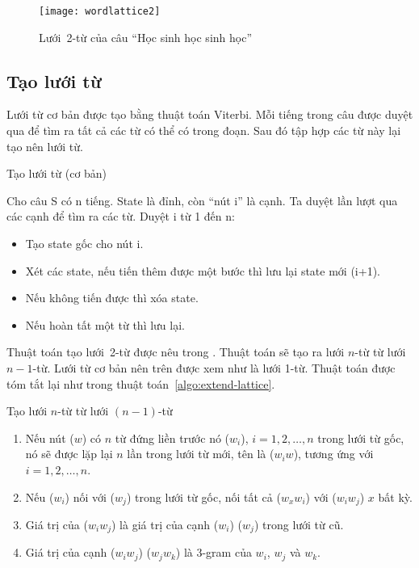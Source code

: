 \documentclass[a4paper,oneside,14pt]{extbook} %
\begin{document}
\begin{figure}[htbp]
  \centering
  \texttt{[image: wordlattice2]}
  \caption{Lưới~2-từ của câu ``Học sinh học sinh học''}
  \label{fig:wordlattice2}
\end{figure}

\subsection{Tạo lưới từ}
\label{sub:lattice:creation}

Lưới từ cơ bản được tạo bằng thuật toán Viterbi. Mỗi tiếng trong câu
được duyệt qua để tìm ra tất cả các từ có thể có trong đoạn. Sau đó
tập hợp các từ này lại tạo nên lưới từ.

\begin{algo}\caption{Tạo lưới từ (cơ bản)}
Cho câu S có n tiếng. State là đỉnh, còn ``nút i'' là cạnh. Ta duyệt
lần lượt qua các cạnh để tìm  ra các từ. Duyệt i từ 1 đến n:
\begin{itemize}
\item Tạo state gốc cho nút i.
\item Xét các state, nếu tiến thêm được một bước thì lưu lại state mới (i+1).
\item Nếu không tiến được thì xóa state.
\item Nếu hoàn tất một từ thì lưu lại.
\end{itemize}
\end{algo}

Thuật toán tạo lưới~2-từ được nêu trong \cite{Ravishankar}. Thuật toán
sẽ tạo ra lưới $n$-từ từ lưới $n-1$-từ. Lưới từ cơ bản nên trên được
xem như là lưới 1-từ. Thuật toán được tóm tắt lại như trong thuật
toán~\ref{algo:extend-lattice}.

\begin{algo}
\caption{Tạo lưới $n$-từ từ lưới $(n-1)$-từ}
\label{algo:extend-lattice}
\begin{enumerate}
\item Nếu nút ($w$) có $n$ từ đứng liền trước nó ($w_i$),
  $i=1,2,\ldots{},n$ trong lưới từ gốc, nó sẽ được lặp lại $n$ lần trong
  lưới từ mới, tên là ($w_{i}w$), tương ứng với $i=1,2,\ldots{},n$.
\item Nếu ($w_i$) nối với ($w_j$) trong lưới từ gốc, nối tất cả
  ($w_xw_i$) với ($w_iw_j$) $x$ bất kỳ.
\item Giá trị của ($w_iw_j$) là giá trị của cạnh ($w_i$) ($w_j$) trong
  lưới từ cũ.
\item Giá trị của cạnh ($w_iw_j$) ($w_jw_k$) là 3-gram của $w_i$, $w_j$
  và $w_k$.
\end{enumerate}
\end{algo}
\end{document}
